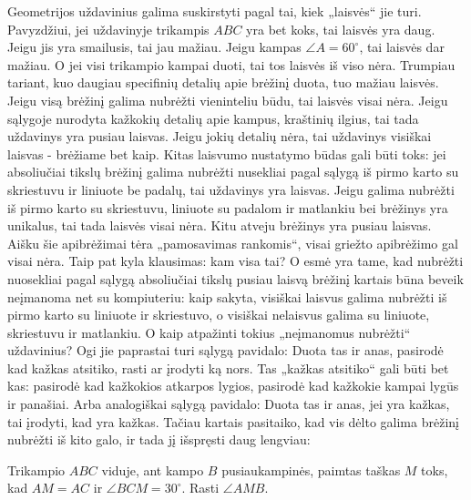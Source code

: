 Geometrijos uždavinius galima suskirstyti pagal tai, kiek „laisvės“ jie
turi. Pavyzdžiui, jei uždavinyje trikampis $ABC$ yra bet koks, tai laisvės
yra daug. Jeigu jis yra smailusis, tai jau mažiau. Jeigu kampas $\angle A
=60^\circ$, tai laisvės dar mažiau. O jei visi trikampio kampai duoti, tai
tos laisvės iš viso nėra. Trumpiau tariant, kuo daugiau specifinių detalių
apie brėžinį duota, tuo mažiau laisvės. Jeigu visą brėžinį galima nubrėžti
vieninteliu būdu, tai laisvės visai nėra. Jeigu sąlygoje nurodyta kažkokių
detalių apie kampus, kraštinių ilgius, tai tada uždavinys yra pusiau
laisvas.  Jeigu jokių detalių nėra, tai uždavinys visiškai laisvas -
brėžiame bet kaip. 
Kitas laisvumo nustatymo būdas gali būti toks: jei absoliučiai tikslų
brėžinį galima nubrėžti nusekliai pagal sąlygą iš pirmo karto su skriestuvu
ir liniuote be padalų, tai uždavinys yra laisvas. Jeigu galima nubrėžti iš
pirmo karto su skriestuvu, liniuote su padalom ir matlankiu bei brėžinys
yra unikalus, tai tada laisvės visai nėra. Kitu atveju brėžinys yra pusiau
laisvas.  Aišku šie apibrėžimai tėra „pamosavimas rankomis“, visai griežto
apibrėžimo gal visai nėra. Taip pat kyla klausimas: kam visa tai? O esmė
yra tame, kad nubrėžti nuosekliai pagal sąlygą absoliučiai tikslų pusiau
laisvą brėžinį kartais būna beveik neįmanoma net su kompiuteriu: kaip
sakyta, visiškai laisvus galima nubrėžti iš pirmo karto su liniuote ir
skriestuvo, o visiškai nelaisvus galima su liniuote, skriestuvu ir
matlankiu. O kaip atpažinti tokius „neįmanomus nubrėžti“ uždavinius? Ogi
jie paprastai turi sąlygą pavidalo: Duota tas ir anas, pasirodė kad kažkas
atsitiko, rasti ar įrodyti ką nors. Tas „kažkas atsitiko“ gali būti bet
kas: pasirodė kad kažkokios atkarpos lygios, pasirodė kad kažkokie kampai
lygūs ir panašiai. Arba analogiškai sąlygą pavidalo: Duota tas ir anas, jei
yra kažkas, tai įrodyti, kad yra kažkas. Tačiau kartais pasitaiko, kad vis
dėlto galima brėžinį nubrėžti iš kito galo, ir tada jį išspręsti daug
lengviau:

\begin{pav}
  Trikampio $ABC$ viduje, ant kampo $B$ pusiaukampinės, paimtas taškas $M$
  toks, kad $AM = AC$ ir $\angle BCM = 30^\circ$. Rasti $\angle AMB$.
\end{pav}

